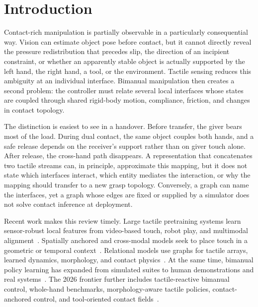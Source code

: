 \section{Introduction}
\label{sec:introduction}

Contact-rich manipulation is partially observable in a particularly consequential
way. Vision can estimate object pose before contact, but it cannot directly reveal
the pressure redistribution that precedes slip, the direction of an incipient
constraint, or whether an apparently stable object is actually supported by the
left hand, the right hand, a tool, or the environment. Tactile sensing reduces
this ambiguity at an individual interface. Bimanual manipulation then creates a
second problem: the controller must relate several local interfaces whose states
are coupled through shared rigid-body motion, compliance, friction, and changes
in contact topology.

The distinction is easiest to see in a handover. Before transfer, the giver bears
most of the load. During dual contact, the same object couples both hands, and a
safe release depends on the receiver's support rather than on giver touch alone.
After release, the cross-hand path disappears. A representation that concatenates
two tactile streams can, in principle, approximate this mapping, but it does not
state which interfaces interact, which entity mediates the interaction, or why
the mapping should transfer to a new grasp topology. Conversely, a graph can name
the interfaces, yet a graph whose edges are fixed or supplied by a simulator does
not solve contact inference at deployment.

Recent work makes this review timely. Large tactile pretraining systems learn
sensor-robust local features from video-based touch, robot play, and multimodal
alignment~\cite{guzey2023tdex,higuera2025sparsh,yang2024unitouch,feng2025anytouch,zhao2024t3}.
Spatially anchored and cross-modal models seek to place touch in a geometric or
temporal context~\cite{huang2025sata,heng2025vitacformer}. Relational models use
graphs for tactile arrays, learned dynamics, morphology, and contact
physics~\cite{funabashi2022distributed,yang2023tacgnn,ai2024robopack,battaglia2016interaction,sanchez2020gns}.
At the same time, bimanual policy learning has expanded from simulated suites to
human demonstrations and real systems~\cite{chen2022bidexhands,grannen2023stabilize,shaw2024bidex,jiang2024dexmimicgen,li2025maniptrans}.
The 2026 frontier further includes tactile-reactive bimanual control, whole-hand
benchmarks, morphology-aware tactile policies, contact-anchored control, and
tool-oriented contact fields~\cite{niu2026trex,yuan2026ftp1,huang2026htbench,cui2026contactanchored,ma2026semanticcontact}.

